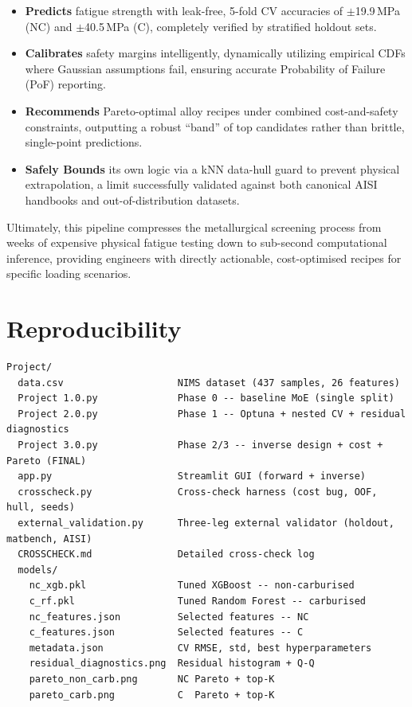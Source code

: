 \documentclass[12pt,a4paper]{article}
\begin{document}
\begin{itemize}
  \item \textbf{Predicts} fatigue strength with leak-free, 5-fold CV accuracies of $\pm$19.9\,MPa (NC) and $\pm$40.5\,MPa (C), completely verified by stratified holdout sets.
  \item \textbf{Calibrates} safety margins intelligently, dynamically utilizing empirical CDFs where Gaussian assumptions fail, ensuring accurate Probability of Failure (PoF) reporting.
  \item \textbf{Recommends} Pareto-optimal alloy recipes under combined cost-and-safety constraints, outputting a robust ``band'' of top candidates rather than brittle, single-point predictions.
  \item \textbf{Safely Bounds} its own logic via a kNN data-hull guard to prevent physical extrapolation, a limit successfully validated against both canonical AISI handbooks and out-of-distribution datasets.
\end{itemize}

Ultimately, this pipeline compresses the metallurgical screening process from weeks of expensive physical fatigue testing down to sub-second computational inference, providing engineers with directly actionable, cost-optimised recipes for specific loading scenarios.
\appendix
\section{Reproducibility}

\begin{lstlisting}
Project/
  data.csv                    NIMS dataset (437 samples, 26 features)
  Project 1.0.py              Phase 0 -- baseline MoE (single split)
  Project 2.0.py              Phase 1 -- Optuna + nested CV + residual diagnostics
  Project 3.0.py              Phase 2/3 -- inverse design + cost + Pareto (FINAL)
  app.py                      Streamlit GUI (forward + inverse)
  crosscheck.py               Cross-check harness (cost bug, OOF, hull, seeds)
  external_validation.py      Three-leg external validator (holdout, matbench, AISI)
  CROSSCHECK.md               Detailed cross-check log
  models/
    nc_xgb.pkl                Tuned XGBoost -- non-carburised
    c_rf.pkl                  Tuned Random Forest -- carburised
    nc_features.json          Selected features -- NC
    c_features.json           Selected features -- C
    metadata.json             CV RMSE, std, best hyperparameters
    residual_diagnostics.png  Residual histogram + Q-Q
    pareto_non_carb.png       NC Pareto + top-K
    pareto_carb.png           C  Pareto + top-K
\end{lstlisting}
\end{document}
